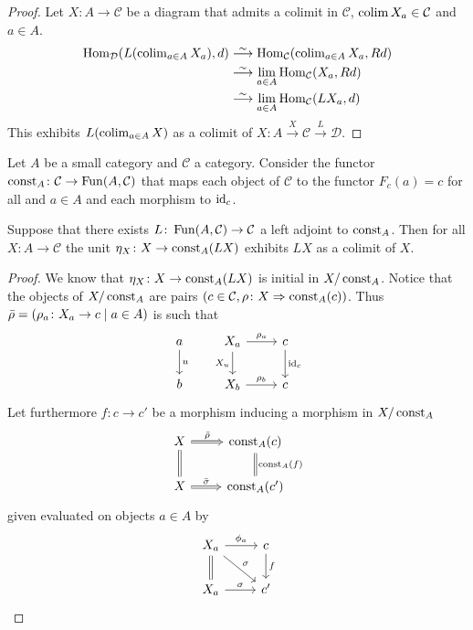 \begin{proof}
    Let $X\colon A \to \mathcal{C}$ be a diagram that admits a colimit in $\mathcal{C}$, $\operatorname{colim} X_a \in \mathcal{C}$ and $ a \in A$.
    \begin{align}
        \Hom_{\mathcal{D}}(L(\colim_{a \in A} X_a),d) 
        &\isomorphism \Hom_{\mathcal{C}}(\colim_{a \in A} X_a, Rd)
        \\
        &\isomorphism \lim_{a \in A} \Hom_{\mathcal{C}}(X_a,Rd)
        \\
        &\isomorphism \lim_{a \in A} \Hom_{\mathcal{C}}(LX_a,d)
        \\
    \end{align}
    This exhibits $L(\operatorname{colim}_{a \in A} X)$ as a colimit of $X\colon A \xrightarrow{X} \mathcal{C} \xrightarrow{L} \mathcal{D}$.
\end{proof}

Let $A$ be a small category and $\mathcal{C}$ a category.
Consider the functor $\operatorname{const}_A \colon \mathcal{C} \to \operatorname{Fun}(A , \mathcal{C})$
that maps each object of $\mathcal{C}$ to the functor $F_c(a)=c$ for all and $a \in A$ and each morphism to $\operatorname{id}_c$.

\begin{prop}
    Suppose that there exists $L \colon \operatorname{Fun}(A,\mathcal{C}) \to \mathcal{C}$ a left adjoint to $\operatorname{const}_A$. 
    Then for all $X \colon A  \to \mathcal{C}$ the unit $\eta_X \colon X \to \operatorname{const}_A(LX)$ exhibits $LX$ as a colimit of $X$.
\end{prop}

\begin{proof}
    We know that $\eta_X \colon X \to \operatorname{const}_A(LX)$ is initial in $X / \operatorname{const}_A$.
    Notice that the objects of $X/\operatorname{const}_A$ are pairs
    $(c \in \mathcal{C}, \rho \colon X \Rightarrow \operatorname{const}_A(c))$.
    Thus $\Bar{\rho} = ( \rho_a \colon X_a \to c \mid a \in A )$ is such that 
    \[
    \begin{tikzcd}
        a
        \arrow[d,"u"]
        &
        X_a 
        \arrow[r, "\rho_a"]
        \arrow[d, "X_u"']
        &
        c
        \arrow[d, "\id_c"]
        \\
        b
        &
        X_b
        \arrow[r, "\rho_b"]
        &
        c
    \end{tikzcd}
    \]
    Let furthermore $f\colon c \to c'$ be a morphism inducing a morphism in $X/\operatorname{const}_A$
    \[
    \begin{tikzcd}
        X 
        \arrow[r, Rightarrow, "\Bar{\rho}"]
        \arrow[d, equal]
        &
        \const_A(c)
        \arrow[d,equal, "\const_A(f)"]
        \\
        X 
        \arrow[r, Rightarrow, "\Bar{\sigma}"]
        &
        \const_A(c')
    \end{tikzcd}
    \]
    given evaluated on objects $a \in A$ by 
    \[
    \begin{tikzcd}
        X_a
        \arrow[r, "\phi_a"]
        \arrow[rd, " \sigma"]
        \arrow[d, equal]
        &
        c
        \arrow[d, "f"]
        \\
        X_a
        \arrow[r,"\sigma"]
        &
        c'
    \end{tikzcd}
    \]
\end{proof}

